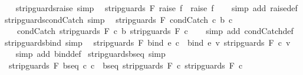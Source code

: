 \begin{isabellebody}
\ \ \isamarkupfalse%
%
\endisatagproof
{\isafoldproof}%
%
\isadelimproof
\isanewline
%
\endisadelimproof
\isanewline
{}\isamarkupfalse%
\ strip{\isacharunderscore}guards{\isacharunderscore}raise\ {\isacharbrackleft}simp{\isacharbrackright}{\isacharcolon}\isanewline
\ \ {\isachardoublequoteopen}strip{\isacharunderscore}guards\ F\ {\isacharparenleft}raise\ f{\isacharparenright}\ {\isacharequal}\ raise\ f{\isachardoublequoteclose}\isanewline
%
\isadelimproof
\ \ %
\endisadelimproof
%
\isatagproof
{}\isamarkupfalse%
\ {\isacharparenleft}simp\ add{\isacharcolon}\ raise{\isacharunderscore}def{\isacharparenright}%
\endisatagproof
{\isafoldproof}%
%
\isadelimproof
\isanewline
%
\endisadelimproof
\isanewline
{}\isamarkupfalse%
\ strip{\isacharunderscore}guards{\isacharunderscore}condCatch\ {\isacharbrackleft}simp{\isacharbrackright}{\isacharcolon}\isanewline
\ \ {\isachardoublequoteopen}strip{\isacharunderscore}guards\ F\ {\isacharparenleft}condCatch\ c{}\ b\ c{}{\isacharparenright}\ {\isacharequal}\ \isanewline
\ \ \ \ condCatch\ {\isacharparenleft}strip{\isacharunderscore}guards\ F\ c{}{\isacharparenright}\ b\ {\isacharparenleft}strip{\isacharunderscore}guards\ F\ c{}{\isacharparenright}{\isachardoublequoteclose}\isanewline
%
\isadelimproof
\ \ %
\endisadelimproof
%
\isatagproof
{}\isamarkupfalse%
\ {\isacharparenleft}simp\ add{\isacharcolon}\ condCatch{\isacharunderscore}def{\isacharparenright}%
\endisatagproof
{\isafoldproof}%
%
\isadelimproof
\isanewline
%
\endisadelimproof
\isanewline
{}\isamarkupfalse%
\ strip{\isacharunderscore}guards{\isacharunderscore}bind\ {\isacharbrackleft}simp{\isacharbrackright}{\isacharcolon}\isanewline
\ \ {\isachardoublequoteopen}strip{\isacharunderscore}guards\ F\ {\isacharparenleft}bind\ e\ c{\isacharparenright}\ {\isacharequal}\ bind\ e\ {\isacharparenleft}{\isasymlambda}v{\isachardot}\ strip{\isacharunderscore}guards\ F\ {\isacharparenleft}c\ v{\isacharparenright}{\isacharparenright}{\isachardoublequoteclose}\isanewline
%
\isadelimproof
\ \ %
\endisadelimproof
%
\isatagproof
{}\isamarkupfalse%
\ {\isacharparenleft}simp\ add{\isacharcolon}\ bind{\isacharunderscore}def{\isacharparenright}%
\endisatagproof
{\isafoldproof}%
%
\isadelimproof
\isanewline
%
\endisadelimproof
\isanewline
{}\isamarkupfalse%
\ strip{\isacharunderscore}guards{\isacharunderscore}bseq\ {\isacharbrackleft}simp{\isacharbrackright}{\isacharcolon}\isanewline
\ \ {\isachardoublequoteopen}strip{\isacharunderscore}guards\ F\ {\isacharparenleft}bseq\ c{}\ c{}{\isacharparenright}\ {\isacharequal}\ bseq\ {\isacharparenleft}strip{\isacharunderscore}guards\ F\ c{}{\isacharparenright}\ {\isacharparenleft}strip{\isacharunderscore}guards\ F\ c{}{\isacharparenright}{\isachardoublequoteclose}\isanewline

\end{isabellebody}
